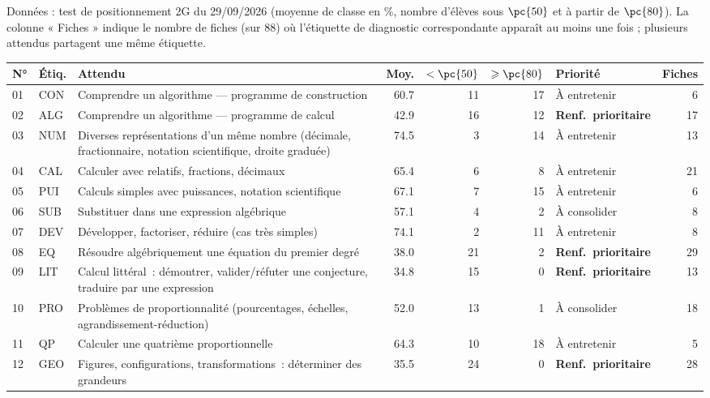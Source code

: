 Données : test de positionnement 2G du 29/09/2026 (moyenne de classe en \%, nombre d'élèves sous $\pc{50}$ et à partir de $\pc{80}$). La colonne « Fiches » indique le nombre de fiches (sur $88$) où l'étiquette de diagnostic correspondante apparaît au moins une fois ; plusieurs attendus partagent une même étiquette.\par\smallskip
{\footnotesize{}\begin{tabular}{@{}l l p{7.1cm} r r r l r@{}}\toprule
N° & Étiq. & Attendu & Moy. & $<\pc{50}$ & $\geqslant\pc{80}$ & Priorité & Fiches \\ \midrule
01 & CON & Comprendre un algorithme — programme de construction & \num{60,7} & 11 & 17 & À entretenir & 6 \\
02 & ALG & Comprendre un algorithme — programme de calcul & \num{42,9} & 16 & 12 & \textbf{Renf.\ prioritaire} & 17 \\
03 & NUM & Diverses représentations d'un même nombre (décimale, fractionnaire, notation scientifique, droite graduée) & \num{74,5} & 3 & 14 & À entretenir & 13 \\
04 & CAL & Calculer avec relatifs, fractions, décimaux & \num{65,4} & 6 & 8 & À entretenir & 21 \\
05 & PUI & Calculs simples avec puissances, notation scientifique & \num{67,1} & 7 & 15 & À entretenir & 6 \\
06 & SUB & Substituer dans une expression algébrique & \num{57,1} & 4 & 2 & À consolider & 8 \\
07 & DEV & Développer, factoriser, réduire (cas très simples) & \num{74,1} & 2 & 11 & À entretenir & 8 \\
08 & EQ & Résoudre algébriquement une équation du premier degré & \num{38,0} & 21 & 2 & \textbf{Renf.\ prioritaire} & 29 \\
09 & LIT & Calcul littéral~: démontrer, valider/réfuter une conjecture, traduire par une expression & \num{34,8} & 15 & 0 & \textbf{Renf.\ prioritaire} & 13 \\
10 & PRO & Problèmes de proportionnalité (pourcentages, échelles, agrandissement-réduction) & \num{52,0} & 13 & 1 & À consolider & 18 \\
11 & QP & Calculer une quatrième proportionnelle & \num{64,3} & 10 & 18 & À entretenir & 5 \\
12 & GEO & Figures, configurations, transformations~: déterminer des grandeurs & \num{35,5} & 24 & 0 & \textbf{Renf.\ prioritaire} & 28 \\

\end{tabular}}
